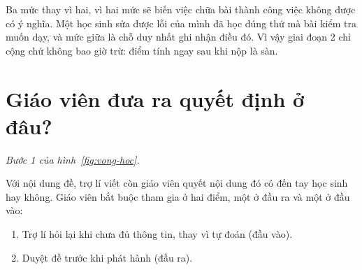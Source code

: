 Ba mức thay vì hai, vì hai mức sẽ biến việc chữa bài thành công việc không được có ý nghĩa. Một học
sinh sửa được lỗi của mình đã học đúng thứ mà bài kiểm tra muốn dạy, và mức giữa là chỗ duy nhất ghi
nhận điều đó. Vì vậy giai đoạn 2 chỉ cộng chứ không bao giờ trừ: điểm tính ngay sau khi nộp là sàn.

\section{Giáo viên đưa ra quyết định ở đâu?}
\label{sec:hai-cong}

\emph{Bước 1 của hình~\ref{fig:vong-hoc}.}

Với nội dung đề, trợ lí viết còn giáo viên quyết nội dung đó có đến tay học sinh hay không. 
Giáo viên bắt buộc tham gia ở hai điểm, một ở đầu ra và một ở đầu vào:

\begin{enumerate}
  \item Trợ lí hỏi lại khi chưa đủ thông tin, thay vì tự đoán (đầu vào).
  \item Duyệt đề trước khi phát hành (đầu ra).
\end{enumerate}
